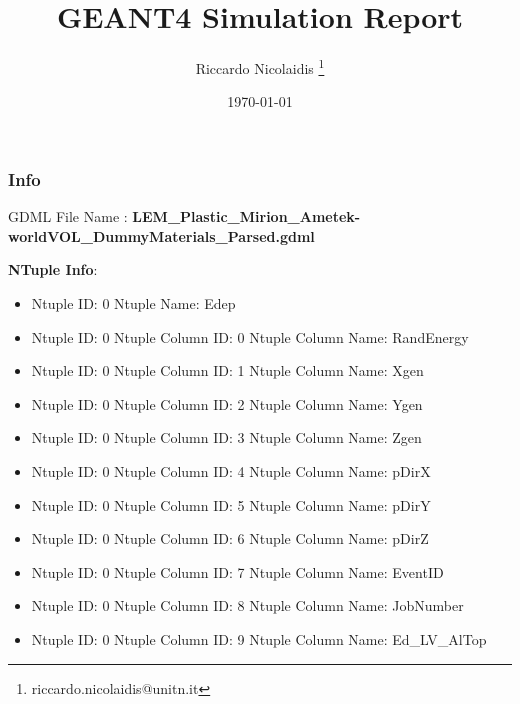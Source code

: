 \documentclass[8pt]{beamer}
\title{GEANT4 Simulation Report}
\author{Riccardo Nicolaidis \footnote{riccardo.nicolaidis@unitn.it}}
\date{\today}
\begin{document}
        
            \begin{frame}
                \titlepage
            \end{frame}
            
            \begin{frame}
                \frametitle{Info}
            
                \centering
                GDML File Name : \textbf{ LEM\_Plastic\_Mirion\_Ametek-worldVOL\_DummyMaterials\_Parsed.gdml}
                
                
                \vspace{2 cm}
                \textbf{NTuple Info}:
                \vspace{1 cm}
                
        \begin{itemize}
        
        \item Ntuple ID: 0 Ntuple Name: Edep
        
        \item Ntuple ID: 0 Ntuple Column ID: 0 Ntuple Column Name: RandEnergy
        
        \item Ntuple ID: 0 Ntuple Column ID: 1 Ntuple Column Name: Xgen
        
        \item Ntuple ID: 0 Ntuple Column ID: 2 Ntuple Column Name: Ygen
        
        \item Ntuple ID: 0 Ntuple Column ID: 3 Ntuple Column Name: Zgen
        
        \item Ntuple ID: 0 Ntuple Column ID: 4 Ntuple Column Name: pDirX
        
        \item Ntuple ID: 0 Ntuple Column ID: 5 Ntuple Column Name: pDirY
        
        \item Ntuple ID: 0 Ntuple Column ID: 6 Ntuple Column Name: pDirZ
        
        \item Ntuple ID: 0 Ntuple Column ID: 7 Ntuple Column Name: EventID
        
        \item Ntuple ID: 0 Ntuple Column ID: 8 Ntuple Column Name: JobNumber
        
        \item Ntuple ID: 0 Ntuple Column ID: 9 Ntuple Column Name: Ed\_LV\_AlTop
        

\end{itemize}
\end{frame}
\end{document}
